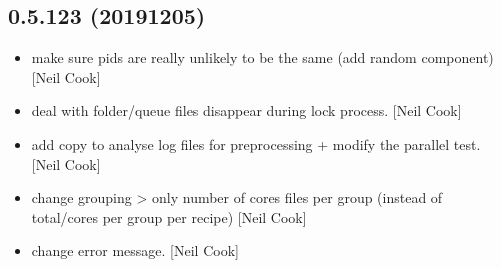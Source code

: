 \documentclass[a4paper,10pt,english]{report}
\begin{document}
\subsection{0.5.123 (2019\sphinxhyphen{}12\sphinxhyphen{}05)}
\label{\detokenize{misc/changelog:id39}}\begin{itemize}
\item {} 
 \sphinxhyphen{} make sure pids are really unlikely to be the
same (add random component) {[}Neil Cook{]}

\item {} 
 \sphinxhyphen{} deal with folder/queue files disappear during lock
process. {[}Neil Cook{]}

\item {} 
 \sphinxhyphen{} add copy to analyse log files for preprocessing +
modify the parallel test. {[}Neil Cook{]}

\item {} 
 \sphinxhyphen{} change grouping \textendash{}\textgreater{} only number
of cores files per group (instead of total/cores per group  per
recipe) {[}Neil Cook{]}

\item {} 
 \sphinxhyphen{} change error message. {[}Neil
Cook{]}

\end{itemize}
\end{document}

